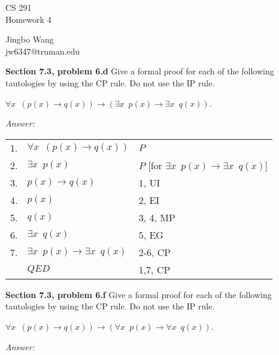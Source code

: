 \documentclass[12pt]{article}
\begin{document}
\begin{center}
{\large CS 291}\\
Homework 4
\end{center}

\begin{flushright}
Jingbo Wang\\
jw6347@truman.edu \\
\end{flushright}


\textbf{Section 7.3, problem 6.d}  Give a formal proof for each of the
following tautologies by using the CP rule. Do not use the IP rule.

$\forall x \enspace (p(x) \rightarrow q(x)) \rightarrow (\exists x 
\enspace p(x) \rightarrow \exists x \enspace q(x))$.

\emph{Answer:} 

\begin{tabular}{p{.8cm}p{8.5cm}l}
1. & $\forall x \enspace (p(x) \rightarrow q(x))$ & $P$ \\
2. & \qquad $\exists x \enspace p(x)$  
                 & $P$  [for $\exists x \enspace p(x) \rightarrow \exists x \enspace q(x)$] \\
3. & \qquad $p(x) \rightarrow q(x)$ & 1, UI \\
4. & \qquad $p(x)$ & 2, EI \\
5. & \qquad $q(x)$ & 3, 4, MP \\
6. & \qquad $\exists x \enspace q(x)$ & 5, EG \\
7. & $\exists x \enspace p(x) \rightarrow \exists x \enspace q(x)$ & 2-6, CP \\
& $QED$ & 1,7, CP \\
\end{tabular}

\textbf{Section 7.3, problem 6.f}  Give a formal proof for each of the
following tautologies by using the CP rule. Do not use the IP rule.

$\forall x \enspace (p(x) \rightarrow q(x)) \rightarrow (\forall x 
\enspace p(x) \rightarrow \forall x \enspace q(x))$.

\emph{Answer:} 
\end{document}
